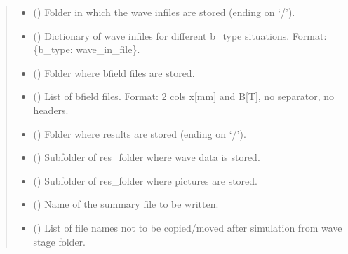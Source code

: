 \documentclass[letterpaper,10pt,english]{sphinxmanual}
\begin{document}
\begin{fulllineitems}
\begin{fulllineitems}
\begin{quote}
\begin{description}
\begin{itemize}
\item {} 
\sphinxAtStartPar
{} () \textendash{} Folder in which the wave in\sphinxhyphen{}files are stored (ending on ‘/’).

\item {} 
\sphinxAtStartPar
{} () \textendash{} Dictionary of wave in\sphinxhyphen{}files for different b\_type situations. Format: \{b\_type: wave\_in\_file\}.

\item {} 
\sphinxAtStartPar
{} () \textendash{} Folder where b\sphinxhyphen{}field files are stored.

\item {} 
\sphinxAtStartPar
{} () \textendash{} List of b\sphinxhyphen{}field files. Format: 2 cols \sphinxhyphen{} x{[}mm{]} and B{[}T{]}, no separator, no headers.

\item {} 
\sphinxAtStartPar
{} () \textendash{} Folder where results are stored (ending on ‘/’).

\item {} 
\sphinxAtStartPar
{} () \textendash{} Subfolder of res\_folder where wave data is stored.

\item {} 
\sphinxAtStartPar
{} () \textendash{} Subfolder of res\_folder where pictures are stored.

\item {} 
\sphinxAtStartPar
{} () \textendash{} Name of the summary file to be written.

\item {} 
\sphinxAtStartPar
{} () \textendash{} List of file names not to be copied/moved after simulation from wave stage folder.


\end{itemize}
\end{description}
\end{quote}
\end{fulllineitems}
\end{fulllineitems}
\end{document}

